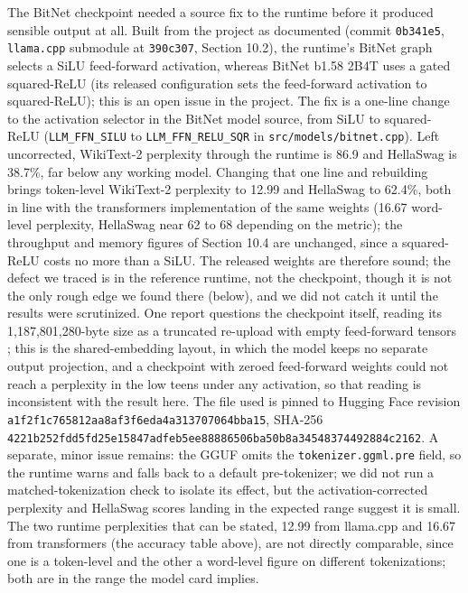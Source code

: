 \documentclass[11pt]{article}
\begin{document}
The BitNet checkpoint needed a source fix to the runtime before it produced sensible
output at all. Built from the project as documented (commit \texttt{0b341e5}, \texttt{llama.cpp}
submodule at \texttt{390c307}, Section 10.2), the runtime's BitNet graph selects a SiLU
feed-forward activation, whereas BitNet b1.58 2B4T uses a gated squared-ReLU (its
released configuration sets the feed-forward activation to squared-ReLU); this is an open
issue in the project. The fix is a one-line change to the activation selector in the
BitNet model source, from SiLU to squared-ReLU (\texttt{LLM\_FFN\_SILU} to \texttt{LLM\_FFN\_RELU\_SQR} in
\texttt{src/models/bitnet.cpp}). Left uncorrected, WikiText-2 perplexity through the runtime is 86.9 and
HellaSwag is 38.7\%, far below any working model. Changing that one line and rebuilding
brings token-level WikiText-2 perplexity to 12.99 and HellaSwag
to 62.4\%, both in line with the transformers implementation of the same weights (16.67
word-level perplexity, HellaSwag near 62 to 68 depending on the metric); the throughput
and memory figures of Section 10.4 are unchanged, since a squared-ReLU costs no more than
a SiLU. The released weights are therefore sound; the defect we traced is in the reference
runtime, not the checkpoint, though it is not the only rough edge we found there (below),
and we did not catch it until the results were scrutinized. One report questions
the checkpoint itself, reading its 1,187,801,280-byte size as a truncated re-upload with
empty feed-forward tensors \cite{web-bitnetIssue608}; this is
the shared-embedding layout, in which the model keeps no separate output projection, and
a checkpoint with zeroed feed-forward weights could not reach a perplexity in the low
teens under any activation, so that reading is inconsistent with the result here. The
file used is pinned to Hugging Face revision \texttt{a1f2f1c765812aa8af3f6eda4a313707064bba15},
SHA-256 \texttt{4221b252fdd5fd25e15847adfeb5ee88886506ba50b8a34548374492884c2162}. A separate,
minor issue remains: the GGUF omits the \texttt{tokenizer.ggml.pre} field, so the runtime warns
and falls back to a default pre-tokenizer; we did not run a matched-tokenization check
to isolate its effect, but the activation-corrected perplexity and HellaSwag scores
landing in the expected range suggest it is small. The two runtime perplexities that can be
stated, 12.99 from llama.cpp and 16.67 from transformers (the accuracy table above), are
not directly comparable, since one is a token-level and the other a word-level figure on
different tokenizations; both are in the range the model card implies.
\end{document}
